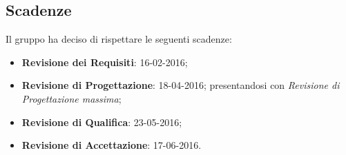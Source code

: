 \subsection{Scadenze}
Il gruppo \textit{\gruppo} ha deciso di rispettare le seguenti scadenze:
\begin{itemize}
	\item \textbf{Revisione dei Requisiti}: 16-02-2016;
	\item \textbf{Revisione di Progettazione}: 18-04-2016; presentandosi con \textit{Revisione di Progettazione massima};
	\item \textbf{Revisione di Qualifica}: 23-05-2016;
	\item \textbf{Revisione di Accettazione}: 17-06-2016.
\end{itemize}
